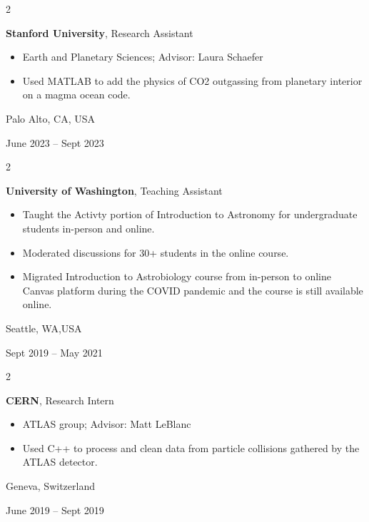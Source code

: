\documentclass[10pt, letterpaper]{article}
\newenvironment{highlights}{
    \begin{itemize}[
        topsep=0.10 cm,
        parsep=0.10 cm,
        partopsep=0pt,
        itemsep=0pt,
        leftmargin=0.4 cm + 10pt
    ]
}{
    \end{itemize}
} %
\newenvironment{twocolentry}[2][]{
    \onecolentry
    \def\secondColumn{#2}
    \setcolumnwidth{\fill, 4.5 cm}
    \begin{paracol}{2}
}{
    \switchcolumn \raggedleft \secondColumn
    \end{paracol}
    \endonecolentry
} %
\begin{document}
        \vspace{0.2 cm}

        \begin{twocolentry}{
            Palo Alto, CA, USA

        June 2023 – Sept 2023
        }
            \textbf{Stanford University}, Research Assistant
            \begin{highlights}
                \item Earth and Planetary Sciences; Advisor: Laura Schaefer
                \item Used MATLAB to add the physics of CO2 outgassing from planetary interior on a magma ocean code.
            \end{highlights}
        \end{twocolentry}


        \vspace{0.2 cm}

        \begin{twocolentry}{
            Seattle, WA,USA

        Sept 2019 – May 2021
        }
            \textbf{University of Washington}, Teaching Assistant
            \begin{highlights}
                \item Taught the Activty portion of Introduction to Astronomy for undergraduate students in-person and online.
                \item Moderated discussions for 30+ students in the online course.
                \item Migrated Introduction to Astrobiology course from in-person to online Canvas platform during the COVID pandemic and the course is still available online.
            \end{highlights}
        \end{twocolentry}


        \vspace{0.2 cm}

        \begin{twocolentry}{
            Geneva, Switzerland

        June 2019 – Sept 2019
        }
            \textbf{CERN}, Research Intern
            \begin{highlights}
                \item ATLAS group; Advisor: Matt LeBlanc
                \item Used C++ to process and clean data from particle collisions gathered by the ATLAS detector.
            \end{highlights}
        \end{twocolentry}
\end{document}
